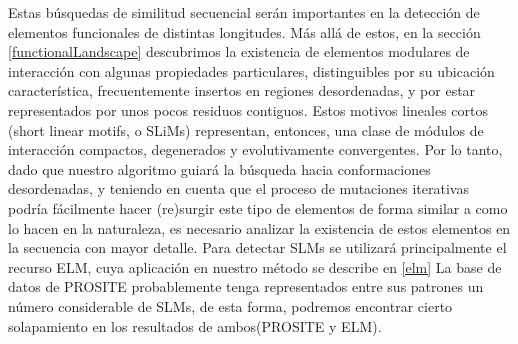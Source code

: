 Estas búsquedas de similitud secuencial serán importantes en la detección de elementos funcionales de distintas longitudes. 
Más allá de estos, en la sección \ref{functionalLandscape} descubrimos la existencia de elementos modulares de interacción con algunas propiedades particulares,  
distinguibles por su ubicación característica, frecuentemente insertos en regiones desordenadas, y por estar representados por unos pocos residuos contiguos.  
Estos motivos lineales cortos (short linear motifs, o SLiMs) representan, entonces, una clase de módulos de interacción compactos, degenerados y evolutivamente convergentes.
Por lo tanto, dado que nuestro algoritmo guiará la búsqueda hacia conformaciones desordenadas, y teniendo en cuenta que el proceso de mutaciones iterativas podría fácilmente hacer (re)surgir este tipo de elementos de forma similar 
a como lo hacen en la naturaleza, es necesario analizar la existencia de estos elementos en la secuencia con mayor detalle.
Para detectar SLMs se utilizará principalmente el recurso ELM, cuya aplicación en nuestro método se describe en \ref{elm}
La base de datos de PROSITE probablemente tenga representados entre sus patrones un número considerable de SLMs, de esta forma, podremos encontrar cierto solapamiento en los resultados de ambos(PROSITE y ELM). 



